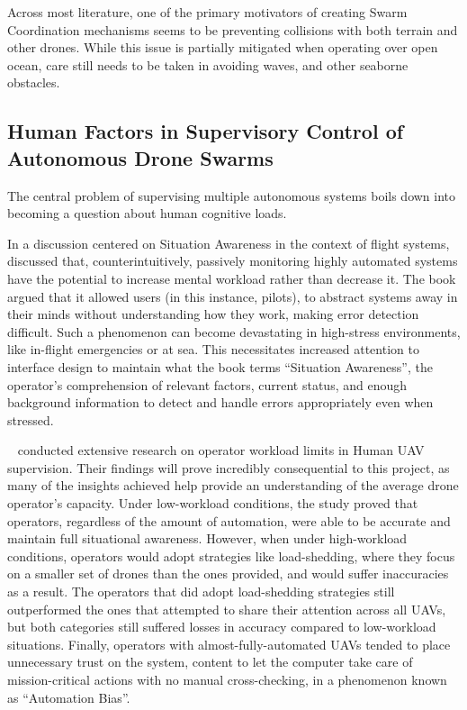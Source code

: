 Across most literature, one of the primary motivators of creating Swarm Coordination mechanisms seems to be preventing collisions with both terrain and other drones.
While this issue is partially mitigated when operating over open ocean, care still needs to be taken in avoiding waves, and other seaborne obstacles.

\subsection{Human Factors in Supervisory Control of Autonomous Drone Swarms}\label{subsec:human-factors-in-supervisory-control-of-autonomous-drone-swarms}
The central problem of supervising multiple autonomous systems boils down into becoming a question about human cognitive loads.

In a discussion centered on Situation Awareness in the context of flight systems, ~\cite{situation_awareness} discussed that, counterintuitively, passively monitoring highly automated systems have the potential to increase mental workload rather than decrease it.
The book argued that it allowed users (in this instance, pilots), to abstract systems away in their minds without understanding how they work, making error detection difficult.
Such a phenomenon can become devastating in high-stress environments, like in-flight emergencies or at sea.
This necessitates increased attention to interface design to maintain what the book terms ``Situation Awareness'', the operator's comprehension of relevant factors, current status, and enough background information to detect and handle errors appropriately even when stressed.

~\cite{CUMMINGS2007339} conducted extensive research on operator workload limits in Human UAV supervision.
Their findings will prove incredibly consequential to this project, as many of the insights achieved help provide an understanding of the average drone operator's capacity.
Under low-workload conditions, the study proved that operators, regardless of the amount of automation, were able to be accurate and maintain full situational awareness.
However, when under high-workload conditions, operators would adopt strategies like load-shedding, where they focus on a smaller set of drones than the ones provided, and would suffer inaccuracies as a result.
The operators that did adopt load-shedding strategies still outperformed the ones that attempted to share their attention across all UAVs, but both categories still suffered losses in accuracy compared to low-workload situations.
Finally, operators with almost-fully-automated UAVs tended to place unnecessary trust on the system, content to let the computer take care of mission-critical actions with no manual cross-checking, in a phenomenon known as ``Automation Bias''.

